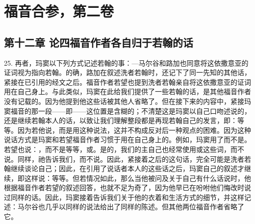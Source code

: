 
\section{福音合参，第二卷}


\subsection{第十二章 论四福音作者各自归于若翰的话}

25. 再者，玛窦以下列方式记述若翰的事：—马尔谷和路加也同意将这依撒意亚的证词视为指向若翰。的确，路加在叙述洗者若翰时，还记下了同一先知的其他话，紧接在已引用的经文之后。福音作者若望也提到洗者若翰亲自将这依撒意亚的证词用在自己身上。与此类似，玛窦在此给我们提供了一些若翰的话，是其他福音作者没有记载的。因为他提到他这些话被其他人省略了。但在接下来的内容中，紧接玛窦福音的那一段——即——这位置是含糊的；不清楚这是玛窦以自己口吻述说的，还是继续若翰本人的话，以致让我们理解整段都是再现若翰自己的发言，即：等等。因为若他说，而是用这种说法，这并不构成反对后一种观点的困难。因为这种说话方式是玛窦和若望福音作者习惯于用在自己身上的。例如，玛窦用了而不是。若望也说：，而不是等等，或。是的，我们的主自己也经常使用或这些词，而不说。同样，祂告诉我们，而不说。因此，紧接着之后的这句话，完全可能是洗者若翰继续谈论自己；因此，在引用了说话者本人的这些话之后，玛窦自己的叙述才继续，即这样说：等等。但若情况如此，那么当他被问及关于自己有什么话说时，他根据福音作者若望的叙述回答，也就不足为奇了，因为他早已在吩咐他们悔改时说过同样的话。因此，玛窦接着告诉我们关于他的衣着和生活方式的细节，并这样记述：马尔谷也几乎以同样的说法给出了同样的陈述。但其他两位福音作者省略了它。\par

